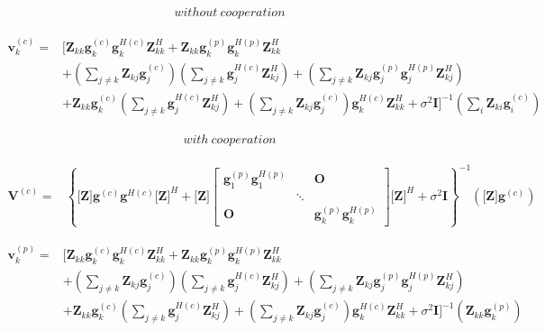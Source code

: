 \documentclass[11pt, oneside]{article}   	%
\begin{document}
\begin{align*}
without \ cooperation
\end{align*}

\begin{align*}
\textbf{v}^{(c)}_{k} = 
&\bigg[
\textbf{Z}_{kk}	\textbf{g}^{(c)}_{k}	\textbf{g}^{H(c)}_{k}	\textbf{Z}^{H}_{kk}
+\textbf{Z}_{kk}	\textbf{g}^{(p)}_{k}	\textbf{g}^{H(p)}_{k}	\textbf{Z}^{H}_{kk}	\\
&+(\displaystyle\sum_{j \neq k}\textbf{Z}_{kj}\textbf{g}^{(c)}_{j})
(\displaystyle\sum_{j \neq k}\textbf{g}^{H(c)}_{j}\textbf{Z}^{H}_{kj})
+(\displaystyle\sum_{j \neq k}\textbf{Z}_{kj}\textbf{g}^{(p)}_{j}	\textbf{g}^{H(p)}_{j}\textbf{Z}^{H}_{kj})	\\
&+\textbf{Z}_{kk}	\textbf{g}^{(c)}_{k}
(\displaystyle\sum_{j \neq k}\textbf{g}^{H(c)}_{j}\textbf{Z}^{H}_{kj})
+(\displaystyle\sum_{j \neq k}\textbf{Z}_{kj}\textbf{g}^{(c)}_{j})
\textbf{g}^{H(c)}_{k}	\textbf{Z}^{H}_{kk}
+\sigma^2	\textbf{I}
\bigg]
^{-1}	 (	\displaystyle\sum_{i}   \textbf{Z}_{ki} 	\textbf{g}^{(c)}_{i}	)
\end{align*}





\begin{align*}
with \ cooperation
\end{align*}

\begin{align*}
\textbf{V}^{(c)} =  		
&\left\{ 
\textbf{[Z]}	\textbf{g}^{(c)}	\textbf{g}^{H(c)}		\textbf{[Z]}^{H}
+\textbf{[Z]}
\begin{bmatrix}
       \textbf{g}^{(p)}_{1}	\textbf{g}^{H(p)}_{1} &  &   \textbf{O}      \\[0.3em]
        & \ddots       & \\[0.3em]
           \textbf{O}        & & \textbf{g}^{(p)}_{k}	\textbf{g}^{H(p)}_{k}
     \end{bmatrix}
    \textbf{[Z]}^{H}
    +\sigma^2	\textbf{I}
\right\}
^{-1} ( \textbf{[Z]}  \textbf{g}^{(c)}	)	
\end{align*}

\begin{align*}
\textbf{v}^{(p)}_{k} =	
 &\bigg[
\textbf{Z}_{kk}	\textbf{g}^{(c)}_{k}	\textbf{g}^{H(c)}_{k}	\textbf{Z}^{H}_{kk}
+\textbf{Z}_{kk}	\textbf{g}^{(p)}_{k}	\textbf{g}^{H(p)}_{k}	\textbf{Z}^{H}_{kk}	\\
&+(\displaystyle\sum_{j \neq k}\textbf{Z}_{kj}\textbf{g}^{(c)}_{j})
(\displaystyle\sum_{j \neq k}\textbf{g}^{H(c)}_{j}\textbf{Z}^{H}_{kj})
+(\displaystyle\sum_{j \neq k}\textbf{Z}_{kj}\textbf{g}^{(p)}_{j}	\textbf{g}^{H(p)}_{j}\textbf{Z}^{H}_{kj})	\\
&+\textbf{Z}_{kk}	\textbf{g}^{(c)}_{k}
(\displaystyle\sum_{j \neq k}\textbf{g}^{H(c)}_{j}\textbf{Z}^{H}_{kj})
+(\displaystyle\sum_{j \neq k}\textbf{Z}_{kj}\textbf{g}^{(c)}_{j})
\textbf{g}^{H(c)}_{k}	\textbf{Z}^{H}_{kk}
+\sigma^2	\textbf{I}
\bigg]^{-1}	 (\textbf{Z}_{kk}  \textbf{g}^{(p)}_{k})
\end{align*}
\end{document}
